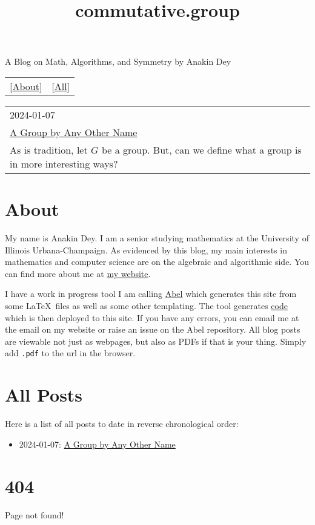 \documentclass{article}
\title{commutative.group}
\begin{document}
\maketitle
\newline
\begin{center}
  A Blog on Math, Algorithms, and Symmetry by Anakin Dey
\end{center}
\begin{table}
  \centering
  \begin{tabular}{cc}
    \LARGE[\href{About.html}{About}] & \LARGE[\href{All-Posts.html}{All}]
  \end{tabular}
\end{table}

\begin{table}
  \centering
  \begin{tabular}{|l|}
    \hline
    \large 2024-01-07 \\
    \LARGE \href{posts/other_name.html}{A Group by Any Other Name} \\
    As is tradition, let $G$ be a group. But, can we define what a group is in more interesting ways? \\
    \hline
  \end{tabular}
\end{table}

\part*{\centering About}

\newline

My name is Anakin Dey.
I am a senior studying mathematics at the University of Illinois Urbana-Champaign.
As evidenced by this blog, my main interests in mathematics and computer science are on the algebraic and algorithmic side.
You can find more about me at \href{https://www.anakin-dey.com/}{my website}.

I have a work in progress tool I am calling \href{https://github.com/Spamakin/abel}{Abel} which generates this site from some \LaTeX\ files as well as some other templating.
The tool generates \href{https://github.com/Spamakin/commutative.group/}{code} which is then deployed to this site.
If you have any errors, you can email me at the email on my website or raise an issue on the Abel repository.
All blog posts are viewable not just as webpages, but also as PDFs if that is your thing.
Simply add \texttt{.pdf} to the url in the browser.

\part*{\centering All Posts}

\newline

Here is a list of all posts to date in reverse chronological order:

\begin{itemize}
\item 2024-01-07: \href{posts/other_name.html}{A Group by Any Other Name}
\end{itemize}

\part*{404}

\newline

Page not found!
\end{document}
